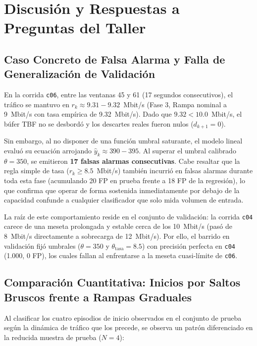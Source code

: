 \documentclass[11pt,a4paper]{article}
\begin{document}
\section{Discusión y Respuestas a Preguntas del Taller}
\label{sec:discusion}

\subsection{Caso Concreto de Falsa Alarma y Falla de Generalización de Validación}
En la corrida \texttt{c06}, entre las ventanas 45 y 61 (17 segundos consecutivos), el tráfico se mantuvo en $r_k \approx 9.31 - 9.32$~Mbit/s (Fase 3, Rampa nominal a 9~Mbit/s con tasa empírica de 9.32~Mbit/s). Dado que $9.32 < 10.0$~Mbit/s, el búfer TBF no se desbordó y los descartes reales fueron nulos ($d_{k+1} = 0$). 

Sin embargo, al no disponer de una función umbral saturante, el modelo lineal evaluó su ecuación arrojando $\hat{y}_k \approx 390 - 395$. Al superar el umbral calibrado $\theta = 350$, se emitieron \textbf{17 falsas alarmas consecutivas}. Cabe resaltar que la regla simple de tasa ($r_k \ge 8.5$~Mbit/s) también incurrió en falsas alarmas durante toda esta fase (acumulando 20 FP en prueba frente a 18 FP de la regresión), lo que confirma que operar de forma sostenida inmediatamente por debajo de la capacidad confunde a cualquier clasificador que solo mida volumen de entrada.

La raíz de este comportamiento reside en el conjunto de validación: la corrida \texttt{c04} carece de una meseta prolongada y estable cerca de los 10~Mbit/s (pasó de 8~Mbit/s directamente a sobrecarga de 12~Mbit/s). Por ello, el barrido en validación fijó umbrales ($\theta = 350$ y $\theta_{\text{tasa}} = 8.5$) con precisión perfecta en \texttt{c04} (1.000, 0 FP), los cuales fallan al enfrentarse a la meseta cuasi-límite de \texttt{c06}.

\subsection{Comparación Cuantitativa: Inicios por Saltos Bruscos frente a Rampas Graduales}
Al clasificar los cuatro episodios de inicio observados en el conjunto de prueba según la dinámica de tráfico que los precede, se observa un patrón diferenciado en la reducida muestra de prueba ($N=4$):
\end{document}
